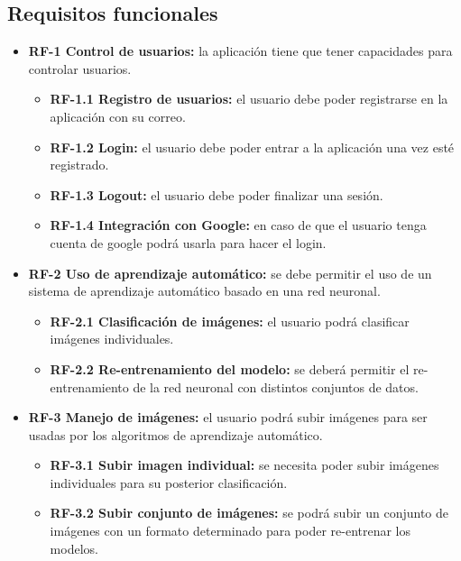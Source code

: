 \subsection{Requisitos funcionales}
\begin{itemize}
\tightlist
\item
  \textbf{RF-1 Control de usuarios:} la aplicación tiene que tener capacidades para controlar usuarios.

  \begin{itemize}
  \tightlist
  \item
    \textbf{RF-1.1 Registro de usuarios:} el usuario debe poder registrarse en la aplicación con su correo.
  \item
    \textbf{RF-1.2 Login:} el usuario debe poder entrar a la aplicación una vez esté registrado.
  \item
    \textbf{RF-1.3 Logout:} el usuario debe poder finalizar una sesión.
  \item
    \textbf{RF-1.4 Integración con Google:} en caso de que el usuario tenga cuenta de google podrá usarla para hacer el login.
  \end{itemize}
\item
  \textbf{RF-2 Uso de aprendizaje automático:} se debe permitir el uso de un sistema de aprendizaje automático basado en una red neuronal.
  
  \begin{itemize}
  \tightlist
  \item
    \textbf{RF-2.1 Clasificación de imágenes:} el usuario podrá clasificar imágenes individuales.
  \item
    \textbf{RF-2.2 Re-entrenamiento del modelo:} se deberá permitir el re-entrenamiento de la red neuronal con distintos conjuntos de datos.
    
  \end{itemize}
\item
  \textbf{RF-3 Manejo de imágenes:} el usuario podrá subir imágenes para ser usadas por los algoritmos de aprendizaje automático.
  
  \begin{itemize}
  \tightlist
  \item
    \textbf{RF-3.1 Subir imagen individual:} se necesita poder subir imágenes individuales para su posterior clasificación.
  \item
    \textbf{RF-3.2 Subir conjunto de imágenes:} se podrá subir un conjunto de imágenes con un formato determinado para poder re-entrenar los modelos.    
  \end{itemize}
\end{itemize}

